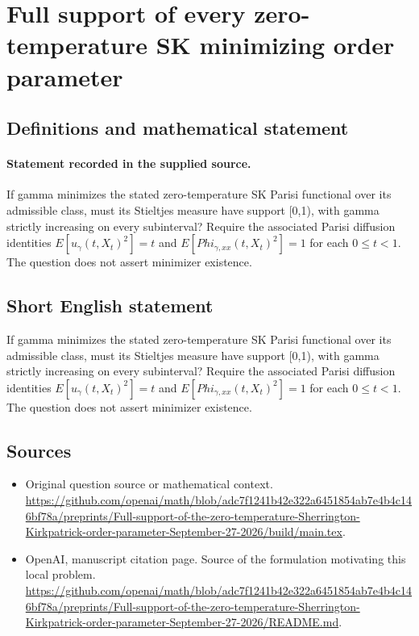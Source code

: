 \documentclass[11pt]{article}
\begin{document}
\section*{Full support of every zero-temperature SK minimizing order parameter}\label{statement}
\subsection{Definitions and mathematical statement}
\paragraph{Statement recorded in the supplied source.}
If gamma minimizes the stated zero-temperature SK Parisi functional over its admissible class, must its Stieltjes measure have support [0,1), with gamma strictly increasing on every subinterval? Require the associated Parisi diffusion identities $E[u_\gamma (t,X_t)^2]=t$ and $E[Phi_{\gamma ,xx}(t,X_t)^2]=1$ for each $0\leq t<1$. The question does not assert minimizer existence.
\subsection{Short English statement}
If gamma minimizes the stated zero-temperature SK Parisi functional over its admissible class, must its Stieltjes measure have support [0,1), with gamma strictly increasing on every subinterval? Require the associated Parisi diffusion identities $E[u_\gamma (t,X_t)^2]=t$ and $E[Phi_{\gamma ,xx}(t,X_t)^2]=1$ for each $0\leq t<1$. The question does not assert minimizer existence.
\subsection{Sources}
\begin{itemize}
\item[S1] Original question source or mathematical context.
\url{https://github.com/openai/math/blob/adc7f1241b42e322a6451854ab7e4b4c146bf78a/preprints/Full-support-of-the-zero-temperature-Sherrington-Kirkpatrick-order-parameter-September-27-2026/build/main.tex}.
\item[S2] OpenAI, manuscript citation page. Source of the formulation motivating this local problem.
\url{https://github.com/openai/math/blob/adc7f1241b42e322a6451854ab7e4b4c146bf78a/preprints/Full-support-of-the-zero-temperature-Sherrington-Kirkpatrick-order-parameter-September-27-2026/README.md}.
\end{itemize}
\end{document}
